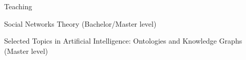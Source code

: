 %

\begin{rSection}{Teaching}
    \begin{description}[nosep]
        \item [\href{https://web.archive.org/web/20220707214216/https://www.uib.no/en/course/INF207}{INF207-22H}:] Social Networks Theory (Bachelor/Master level)
        \item [\href{https://web.archive.org/web/20210918132515/https://www.uib.no/en/course/INF367}{INF367-21H}:] Selected Topics in Artificial Intelligence: Ontologies and Knowledge Graphs (Master level)
    \end{description}
\end{rSection}
